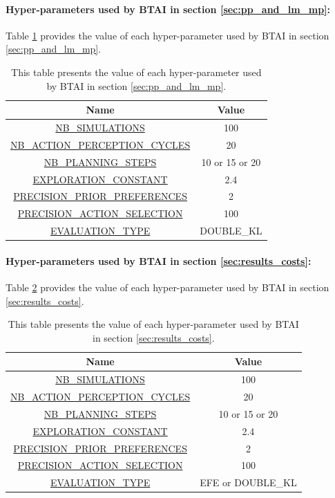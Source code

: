 \documentclass[twoside,11pt]{article}
\begin{document}
\paragraph{Hyper-parameters used by BTAI in section \ref{sec:pp_and_lm_mp}:}

Table \ref{tab:values_hp_pp_and_lm_mp} provides the value of each hyper-parameter used by BTAI in section \ref{sec:pp_and_lm_mp}.

\begin{table}[H]
\centering
\begin{tabular}{ |c|c|  }
 \hline
 Name & Value\\
 \hline
 \hline
 \url{NB_SIMULATIONS} & 100\\
 \hline
 \url{NB_ACTION_PERCEPTION_CYCLES} & 20\\
 \hline
 \url{NB_PLANNING_STEPS} & 10 or 15 or 20\\
 \hline
 \url{EXPLORATION_CONSTANT} & 2.4\\
 \hline
 \url{PRECISION_PRIOR_PREFERENCES} & 2\\
 \hline
 \url{PRECISION_ACTION_SELECTION} & 100\\
 \hline
 \url{EVALUATION_TYPE} & DOUBLE\_KL\\
 \hline
\end{tabular}
\caption{This table presents the value of each hyper-parameter used by BTAI in section \ref{sec:pp_and_lm_mp}.}
\label{tab:values_hp_pp_and_lm_mp}
\end{table}

\paragraph{Hyper-parameters used by BTAI in section \ref{sec:results_costs}:}

Table \ref{tab:values_hp_results_costs} provides the value of each hyper-parameter used by BTAI in section \ref{sec:results_costs}.

\begin{table}[H]
\centering
\begin{tabular}{ |c|c|  }
 \hline
 Name & Value\\
 \hline
 \hline
 \url{NB_SIMULATIONS} & 100\\
 \hline
 \url{NB_ACTION_PERCEPTION_CYCLES} & 20\\
 \hline
 \url{NB_PLANNING_STEPS} & 10 or 15 or 20\\
 \hline
 \url{EXPLORATION_CONSTANT} & 2.4\\
 \hline
 \url{PRECISION_PRIOR_PREFERENCES} & 2\\
 \hline
 \url{PRECISION_ACTION_SELECTION} & 100\\
 \hline
 \url{EVALUATION_TYPE} & EFE or DOUBLE\_KL\\
 \hline
\end{tabular}
\caption{This table presents the value of each hyper-parameter used by BTAI in section \ref{sec:results_costs}.}
\label{tab:values_hp_results_costs}
\end{table}
\end{document}
